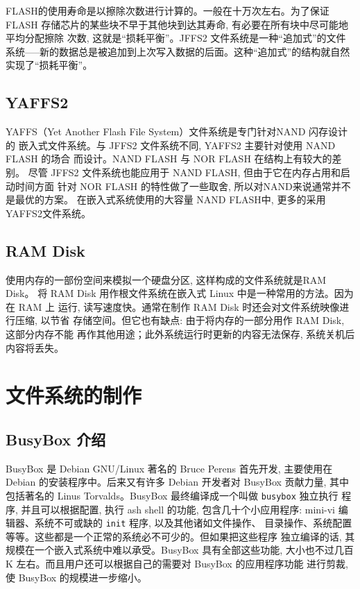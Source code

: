 FLASH的使用寿命是以擦除次数进行计算的。一般在十万次左右。为了保证 FLASH
存储芯片的某些块不早于其他块到达其寿命, 有必要在所有块中尽可能地平均分配擦除
次数, 这就是``损耗平衡''。JFFS2 文件系统是一种``追加式''的文件
系统-----新的数据总是被追加到上次写入数据的后面。这种``追加式''的结构就自然
实现了``损耗平衡''。

\subsection{YAFFS2}
YAFFS（Yet Another Flash File System）文件系统是专门针对NAND 闪存设计的
嵌入式文件系统。与 JFFS2 文件系统不同, YAFFS2 主要针对使用 NAND FLASH 的场合
而设计。NAND FLASH 与 NOR FLASH 在结构上有较大的差别。
尽管 JFFS2 文件系统也能应用于 NAND FLASH, 但由于它在内存占用和启动时间方面
针对 NOR FLASH 的特性做了一些取舍, 所以对NAND来说通常并不是最优的方案。
在嵌入式系统使用的大容量 NAND FLASH中, 更多的采用YAFFS2文件系统。

\subsection{RAM Disk}
使用内存的一部份空间来模拟一个硬盘分区, 这样构成的文件系统就是RAM Disk。
将 RAM Disk 用作根文件系统在嵌入式 Linux 中是一种常用的方法。因为在 RAM 上
运行, 读写速度快。通常在制作 RAM Disk 时还会对文件系统映像进行压缩, 以节省
存储空间。但它也有缺点: 由于将内存的一部分用作 RAM Disk, 这部分内存不能
再作其他用途；此外系统运行时更新的内容无法保存, 系统关机后内容将丢失。

\section{文件系统的制作}

\subsection{BusyBox 介绍}
BusyBox 是 Debian GNU/Linux 著名的 Bruce Perens 首先开发, 主要使用在
Debian 的安装程序中。后来又有许多 Debian 开发者对 BusyBox 贡献力量, 其中
包括著名的 Linus Torvalds。BusyBox 最终编译成一个叫做 \verb|busybox| 独立执行
程序, 并且可以根据配置, 执行 ash shell 的功能, 包含几十个小应用程序:
mini-vi 编辑器、系统不可或缺的 \verb|init| 程序, 以及其他诸如文件操作、
目录操作、系统配置等等。这些都是一个正常的系统必不可少的。但如果把这些程序
独立编译的话, 其规模在一个嵌入式系统中难以承受。BusyBox 具有全部这些功能,
大小也不过几百 K 左右。而且用户还可以根据自己的需要对 BusyBox 的应用程序功能
进行剪裁, 使 BusyBox 的规模进一步缩小。


